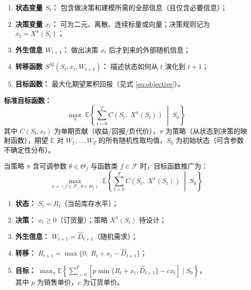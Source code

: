 \documentclass[11pt, a4paper]{article}
\begin{document}
\begin{tcolorbox}[keybox={通用建模框架（Universal Modeling Framework）}]
\begin{enumerate}[leftmargin=1.5em, label=\textbf{(\arabic*)}, itemsep=3pt]
  \item \textbf{状态变量 $S_t$：} 包含做决策和建模所需的全部信息（且仅含必要信息）；
  \item \textbf{决策变量 $x_t$：} 可为二元、离散、连续标量或向量；决策规则记为 $x_t = X^\pi(S_t)$；
  \item \textbf{外生信息 $W_{t+1}$：} 做出决策 $x_t$ 后才到来的外部随机信息；
  \item \textbf{转移函数 $S^M(S_t, x_t, W_{t+1})$：} 描述状态如何从 $t$ 演化到 $t+1$；
  \item \textbf{目标函数：} 最大化期望累积回报（见式 \eqref{eq:objective}）。
\end{enumerate}
\end{tcolorbox}

\noindent\textbf{标准目标函数：}
\begin{equation}
  \max_{\pi}\; \mathbb{E}\!\left\{
    \sum_{t=0}^{T} C(S_t,\; X^\pi(S_t)) \;\middle|\; S_0
  \right\}
  \label{eq:objective}
\end{equation}
其中 $C(S_t, x_t)$ 为单期贡献（收益/回报/负代价），$\pi$ 为策略（从状态到决策的映射函数），期望 $\mathbb{E}$ 对 $W_1, \ldots, W_T$ 的所有随机性取均值，$S_0$ 为初始状态（可含参数不确定性分布）。

当策略 $\pi$ 含可调参数 $\theta \in \Theta_f$ 与函数类 $f \in \mathcal{F}$ 时，目标函数推广为：
\begin{equation}
  \max_{\pi = (f \in \mathcal{F},\; \theta \in \Theta_f)}\; \mathbb{E}\!\left\{
    \sum_{t=0}^{T} C(S_t,\; X^\pi(S_t)) \;\middle|\; S_0
  \right\}
  \label{eq:objective_full}
\end{equation}

\begin{tcolorbox}[scenariobox, title={场景一（续）——五元组建模库存问题}]
\begin{enumerate}[leftmargin=1.5em, label=\textbullet, itemsep=1pt]
  \item \textbf{状态：} $S_t = R_t$（当前库存水平）；
  \item \textbf{决策：} $x_t \geq 0$（订货量）；策略 $X^\pi(S_t)$ 待设计；
  \item \textbf{外生信息：} $W_{t+1} = \hat{D}_{t+1}$（随机需求）；
  \item \textbf{转移：} $R_{t+1} = \max\{0,\; R_t + x_t - \hat{D}_{t+1}\}$；
  \item \textbf{目标：} $\max_\pi \mathbb{E}\!\left\{\sum_{t=0}^{T} [p\min\{R_t+x_t,\hat{D}_{t+1}\} - cx_t] \mid S_0\right\}$，\\
        其中 $p$ 为销售单价，$c$ 为订货单价。
\end{enumerate}
\end{tcolorbox}
\end{document}
